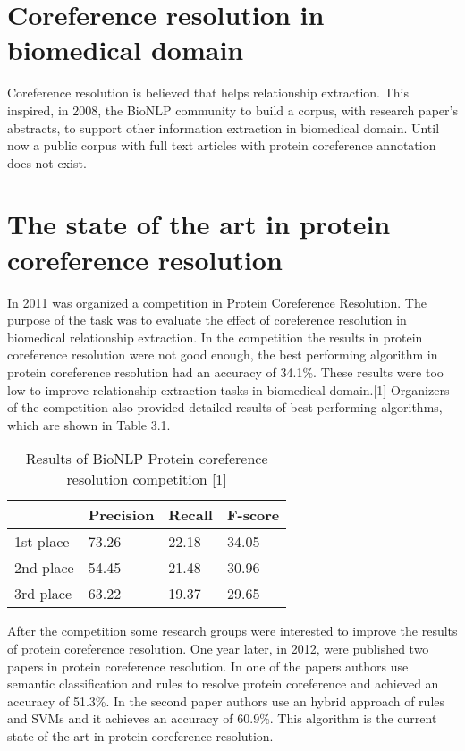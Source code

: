 \section{Coreference resolution in biomedical domain}

Coreference resolution is believed that helps relationship extraction. This inspired, in 2008, the BioNLP community to build a corpus, with research paper's abstracts, to support other information extraction in biomedical domain. Until now a public corpus with full text articles with protein coreference annotation does not exist.

\section{The state of the art in protein coreference resolution} 

In 2011 was organized a competition in Protein Coreference Resolution. The purpose of the task was to evaluate the effect of coreference resolution in biomedical relationship extraction. In the competition the results in protein coreference resolution were not good enough, the best performing algorithm in protein coreference resolution had an accuracy of 34.1\%. These results were too low to improve relationship extraction tasks in biomedical domain.[1] Organizers of the competition also provided detailed results of best performing algorithms, which are shown in Table 3.1.
\newpage
\begin{table}[h]
  \begin{center}
     \begin{tabular}{|l C{2cm} C{2cm} C{2cm}|} 
	 	\hline
  		& Precision & Recall & F-score \\ [1ex] 
 		\hline
 		1st place & 73.26 & 22.18 & 34.05 \\ [1ex]
 		\hline
 		2nd place & 54.45 & 21.48 & 30.96 \\[1ex]
  		\hline
 		3rd place & 63.22 & 19.37 & 29.65 \\ [1ex]
  		\hline
	\end{tabular}
  \end{center} 
  \caption{ Results of BioNLP Protein coreference resolution competition [1]}
  \label{table2}
\end{table}

After the competition some research groups were interested to improve the results of protein coreference resolution. One year later, in 2012, were published two papers in protein coreference resolution. In one of the papers authors use semantic classification and rules to resolve protein coreference and achieved an accuracy of 51.3\%. In the second paper authors use an hybrid approach of rules and SVMs and it achieves an accuracy of 60.9\%. This algorithm is the current state of the art in protein coreference resolution.
 
